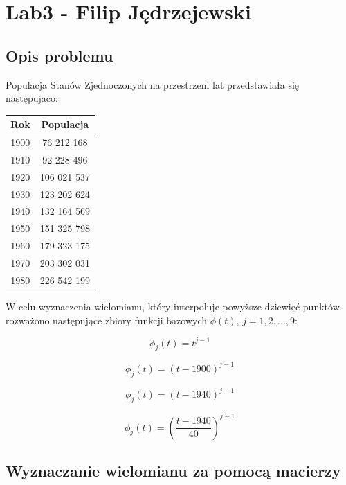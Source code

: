\documentclass{article}
\begin{document}
	\section*{Lab3 - Filip Jędrzejewski}
	
	\subsection*{Opis problemu}
	
	Populacja Stanów Zjednoczonych na przestrzeni lat przedstawiała się następujaco:
	
	\begin{center}
		\begin{tabular}{c|c}
  			\hline 
  			Rok & Populacja\\
  			\hline
  			1900 & 76 212 168 \\
  			1910 & 92 228 496 \\
  			1920 & 106 021 537 \\
  			1930 & 123 202 624 \\
  			1940 & 132 164 569 \\
  			1950 & 151 325 798 \\
  			1960 & 179 323 175 \\
  			1970 & 203 302 031 \\
  			1980 & 226 542 199 \\
		\end{tabular} 
		
	\end{center}
	
	W celu wyznaczenia wielomianu, który interpoluje powyższe dziewięć punktów rozważono następujące zbiory funkcji bazowych $\phi (t)$, $j=1,2,...,9$:
	
	\begin{equation}
		\phi_j (t) = t^{j-1}
	\end{equation}
	
	\begin{equation}
		\phi_j (t) = (t-1900)^{j-1}
	\end{equation}
	
	\begin{equation}
		\phi_j (t) = (t-1940)^{j-1}
	\end{equation}
	
	\begin{equation}
		\phi_j (t) = \left(\frac{t-1940}{40}\right)^{j-1}
	\end{equation}
	
	\subsection*{Wyznaczanie wielomianu za pomocą macierzy}
	
\end{document}
